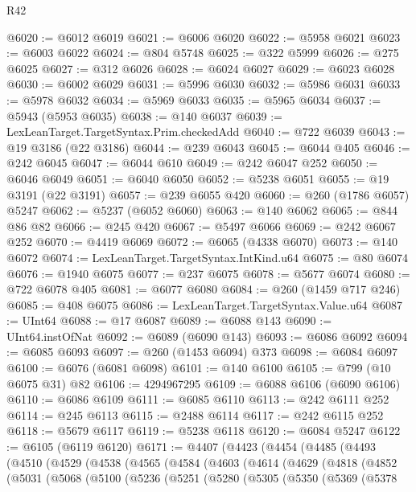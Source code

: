 \begin{lexlean}{R42}
\begin{coremodule}
{@6020 := @6012 @6019
@6021 := @6006 @6020
@6022 := @5958 @6021
@6023 := @6003 @6022
@6024 := @804 @5748
@6025 := @322 @5999
@6026 := @275 @6025
@6027 := @312 @6026
@6028 := @6024 @6027
@6029 := @6023 @6028
@6030 := @6002 @6029
@6031 := @5996 @6030
@6032 := @5986 @6031
@6033 := @5978 @6032
@6034 := @5969 @6033
@6035 := @5965 @6034
@6037 := @5943 (@5953 @6035)
@6038 := @140 @6037
@6039 := LexLeanTarget.TargetSyntax.Prim.checkedAdd
@6040 := @722 @6039
@6043 := @19 @3186 (@22 @3186)
@6044 := @239 @6043
@6045 := @6044 @405
@6046 := @242 @6045
@6047 := @6044 @610
@6049 := @242 @6047 @252
@6050 := @6046 @6049
@6051 := @6040 @6050
@6052 := @5238 @6051
@6055 := @19 @3191 (@22 @3191)
@6057 := @239 @6055 @420
@6060 := @260 (@1786 @6057) @5247
@6062 := @5237 (@6052 @6060)
@6063 := @140 @6062
@6065 := @844 @86 @82
@6066 := @245 @420
@6067 := @5497 @6066
@6069 := @242 @6067 @252
@6070 := @4419 @6069
@6072 := @6065 (@4338 @6070)
@6073 := @140 @6072
@6074 := LexLeanTarget.TargetSyntax.IntKind.u64
@6075 := @80 @6074
@6076 := @1940 @6075
@6077 := @237 @6075
@6078 := @5677 @6074
@6080 := @722 @6078 @405
@6081 := @6077 @6080
@6084 := @260 (@1459 @717 @246)
@6085 := @408 @6075
@6086 := LexLeanTarget.TargetSyntax.Value.u64
@6087 := UInt64
@6088 := @17 @6087
@6089 := @6088 @143
@6090 := UInt64.instOfNat
@6092 := @6089 (@6090 @143)
@6093 := @6086 @6092
@6094 := @6085 @6093
@6097 := @260 (@1453 @6094) @373
@6098 := @6084 @6097
@6100 := @6076 (@6081 @6098)
@6101 := @140 @6100
@6105 := @799 (@10 @6075 @31) @82
@6106 := 4294967295
@6109 := @6088 @6106 (@6090 @6106)
@6110 := @6086 @6109
@6111 := @6085 @6110
@6113 := @242 @6111 @252
@6114 := @245 @6113
@6115 := @2488 @6114
@6117 := @242 @6115 @252
@6118 := @5679 @6117
@6119 := @5238 @6118
@6120 := @6084 @5247
@6122 := @6105 (@6119 @6120)
@6171 := @4407
    (@4423
      (@4454
        (@4485
          (@4493
            (@4510
              (@4529
                (@4538
                  (@4565
                    (@4584
                      (@4603
                        (@4614
                          (@4629
                            (@4818
                              (@4852
                                (@5031
                                  (@5068
                                    (@5100
                                      (@5236
                                        (@5251
                                          (@5280
                                            (@5305
                                              (@5350
                                                (@5369
                                                  (@5378
}
\end{coremodule}
\end{lexlean}
